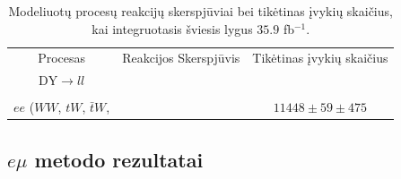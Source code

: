 \documentclass[a4paper, 12pt]{article}
\newcommand{\WW}{W\! W}
\newcommand{\invfb}{fb$^{-1}$}
\begin{document}
\begin{centering}
\begin{table}[H]
\begin{tabular}{|c|c|c|} %
	\hline 
	\multirow{3}{8em}{\centering Procesas} & \multirow{3}{7em}{Reakcijos Skerspjūvis} & \multirow{3}{9em}{Tikėtinas įvykių skaičius} \\
	& & \\
	& & \\
	\hline \hline
	$\mathrm{DY}\rightarrow ll$ &  &  \\
	& & \\
	\hline
	$ee$ ($\WW$, $tW$, $\bar{t}W$, & \multirow{2}{7em}{\centering\textendash} & \multirow{2}{9em}{\centering $11448 \pm 59 \pm 475$} \\
	\hline
\end{tabular}
\caption{\label{table:NLOweight} Modeliuotų procesų reakcijų skerspjūviai bei tikėtinas įvykių skaičius, kai integruotasis
	šviesis lygus $35.9$ \invfb.}
\end{table}
\end{centering}

\subsection{$e\mu$ metodo rezultatai}
\end{document}
